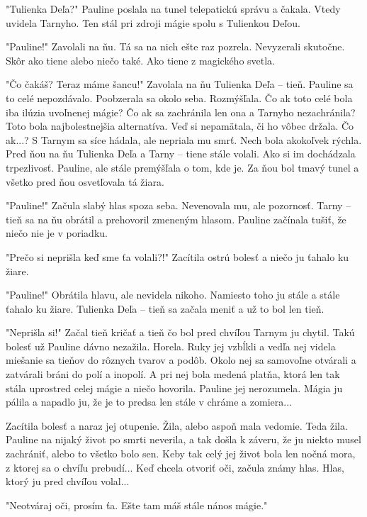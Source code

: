 \documentclass{book}
\begin{document}
"$ $Tulienka Deľa?"$ $  Pauline poslala na tunel telepatickú správu a čakala. Vtedy uvidela Tarnyho. Ten stál pri zdroji mágie spolu s Tulienkou Deľou.

"$ $Pauline!"$ $  Zavolali na ňu. Tá sa na nich ešte raz pozrela. Nevyzerali skutočne. Skôr ako tiene alebo niečo také. Ako tiene z magického svetla.

"$ $Čo čakáš? Teraz máme šancu!"$ $  Zavolala na ňu Tulienka Deľa – tieň. Pauline sa to celé nepozdávalo. Poobzerala sa okolo seba. Rozmýšľala. Čo ak toto celé bola iba ilúzia uvoľnenej mágie? Čo ak sa zachránila len ona a Tarnyho nezachránila? Toto bola najbolestnejšia alternatíva. Veď si nepamätala, či ho vôbec držala. Čo ak...? S Tarnym sa síce hádala, ale nepriala mu smrť. Nech bola akokoľvek rýchla. Pred ňou na ňu Tulienka Deľa a Tarny – tiene stále volali. Ako si im dochádzala trpezlivosť. Pauline, ale stále premýšľala o tom, kde je. Za ňou bol tmavý tunel a všetko pred ňou osvetľovala tá žiara.

"$ $Pauline!"$ $  Začula slabý hlas spoza seba. Nevenovala mu, ale pozornosť. Tarny – tieň sa na ňu obrátil a prehovoril zmeneným hlasom. Pauline začínala tušiť, že niečo nie je v poriadku.

"$ $Prečo si neprišla keď sme ťa volali?!"$ $  Zacítila ostrú bolesť a niečo ju ťahalo ku žiare.

"$ $Pauline!"$ $  Obrátila hlavu, ale nevidela nikoho. Namiesto toho ju stále a stále ťahalo ku žiare. Tulienka Deľa – tieň sa začala meniť a už to bol len tieň.

"$ $Neprišla si!"$ $  Začal tieň kričať a tieň čo bol pred chvíľou Tarnym ju chytil. Takú bolesť už Pauline dávno nezažila. Horela. Ruky jej vzbĺkli a vedľa nej videla miešanie sa tieňov do rôznych tvarov a podôb. Okolo nej sa samovoľne otvárali a zatvárali bráni do polí a inopolí. A pri nej bola medená platňa, ktorá len tak stála uprostred celej mágie a niečo hovorila. Pauline jej nerozumela. Mágia ju pálila a napadlo ju, že je to predsa len stále v chráme a zomiera...

Zacítila bolesť a naraz jej otupenie. Žila, alebo aspoň mala vedomie. Teda žila. Pauline na nijaký život po smrti neverila, a tak došla k záveru, že ju niekto musel zachrániť, alebo to všetko bolo sen. Keby tak celý jej život bola len nočná mora, z ktorej sa o chvíľu prebudí... Keď chcela otvoriť oči, začula známy hlas. Hlas, ktorý ju pred chvíľou volal...

"$ $Neotváraj oči, prosím ťa. Ešte tam máš stále nános mágie."$ $ 
\end{document}
